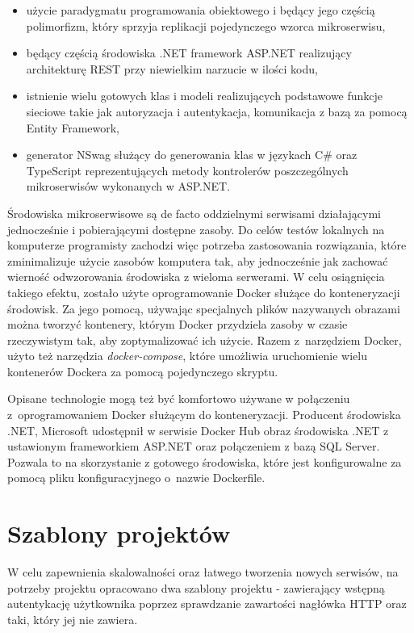 \documentclass{SGGW-thesis}
\begin{document}
  \begin{itemize}
    \item użycie paradygmatu programowania obiektowego i będący jego częścią polimorfizm, który sprzyja replikacji pojedynczego wzorca mikroserwisu,
    \item będący częścią środowiska .NET framework ASP.NET realizujący architekturę REST przy niewielkim narzucie w ilości kodu,
    \item istnienie wielu gotowych klas i modeli realizujących podstawowe funkcje sieciowe takie jak autoryzacja i autentykacja, komunikacja z bazą za pomocą Entity Framework,
    \item generator NSwag służący do generowania klas w językach C\# oraz TypeScript reprezentujących metody kontrolerów poszczególnych mikroserwisów wykonanych w ASP.NET.
  \end{itemize}

  Środowiska mikroserwisowe są de facto oddzielnymi serwisami działającymi jednocześnie i pobierającymi dostępne zasoby. Do celów testów lokalnych na komputerze programisty zachodzi więc potrzeba zastosowania rozwiązania, które zminimalizuje użycie zasobów komputera tak, aby jednocześnie jak zachować wierność odwzorowania środowiska z wieloma serwerami. W celu osiągnięcia takiego efektu, zostało użyte oprogramowanie Docker służące do konteneryzacji środowisk. Za jego pomocą, używając specjalnych plików nazywanych obrazami można tworzyć kontenery, którym Docker przydziela zasoby w czasie rzeczywistym tak, aby zoptymalizować ich użycie. 
  Razem z~narzędziem Docker, użyto też narzędzia \textit{docker-compose}, które umożliwia uruchomienie wielu kontenerów Dockera za pomocą pojedynczego skryptu.

  Opisane technologie mogą też być komfortowo używane w połączeniu z~oprogramowaniem Docker służącym do konteneryzacji. Producent środowiska .NET, Microsoft udostępnił w serwisie Docker Hub obraz środowiska .NET z ustawionym frameworkiem ASP.NET oraz połączeniem z bazą SQL Server. Pozwala to na skorzystanie z gotowego środowiska, które jest konfigurowalne za pomocą pliku konfiguracyjnego o~nazwie Dockerfile.

  \section{Szablony projektów}
  W celu zapewnienia skalowalności oraz łatwego tworzenia nowych serwisów, na potrzeby projektu opracowano dwa szablony projektu - zawierający wstępną autentykację użytkownika poprzez sprawdzanie zawartości nagłówka HTTP oraz taki, który jej nie zawiera.
\end{document}
